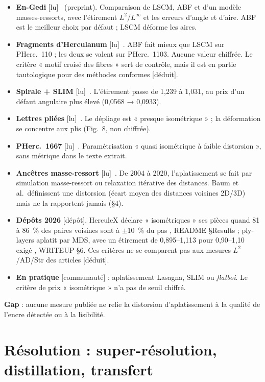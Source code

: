 \documentclass[11pt,a4paper]{article}
\newcommand{\lu}{\textsf{\small[lu]}}
\newcommand{\deduit}{\textsf{\small[déduit]}}
\newcommand{\commu}{\textsf{\small[communauté]}}
\newcommand{\depot}{\textsf{\small[dépôt]}}
\newcommand{\pherc}[1]{PHerc.~#1}
\begin{document}
\begin{itemize}
  \item \textbf{En-Gedi} \lu~\cite{parker2020} (preprint). Comparaison de LSCM, ABF et d'un
  modèle masses-ressorts, avec l'étirement $L^2$/$L^\infty$ et les erreurs d'angle et
  d'aire. ABF est le meilleur choix par défaut ; LSCM déforme les aires.
  \item \textbf{Fragments d'Herculanum} \lu~\cite{stabile2021}. ABF fait mieux que LSCM sur
  \pherc{110} ; les deux se valent sur \pherc{1103}. Aucune valeur chiffrée. Le critère
  « motif croisé des fibres » sert de contrôle, mais il est en partie tautologique pour des
  méthodes conformes \deduit.
  \item \textbf{Spirale + SLIM} \lu~\cite{henderson2025}. L'étirement passe de 1,239 à 1,031,
  au prix d'un défaut angulaire plus élevé (0,0568 → 0,0933).
  \item \textbf{Lettres pliées} \lu~\cite{dambrogio2021}. Le dépliage est « presque
  isométrique » ; la déformation se concentre aux plis (Fig.~8, non chiffrée).
  \item \textbf{\pherc{1667}} \lu~\cite{angelotti2026complete}. Paramétrisation « quasi
  isométrique à faible distorsion », sans métrique dans le texte extrait.
  \item \textbf{Ancêtres masse-ressort} \lu~\cite{seales2004,lin2005,baum2017,mahnke2020}.
  De 2004 à 2020, l'aplatissement se fait par simulation masse-ressort ou relaxation
  itérative des distances. Baum et al.\ définissent une distorsion (écart moyen des distances
  voisines 2D/3D) mais ne la rapportent jamais (§4).
  \item \textbf{Dépôts 2026} \depot. HerculeX déclare « isométriques » ses pièces quand
  81 à 86~\% des paires voisines sont à $\pm$10~\% du pas \cite{betka2026}, README §Results ;
  ply-layers aplatit par MDS, avec un étirement de 0,895–1,113 pour 0,90–1,10 exigé
  \cite{devore2026}, WRITEUP §6. Ces critères ne se comparent pas aux mesures $L^2$/AD/Str
  des articles \deduit.
  \item \textbf{En pratique} \commu{} : aplatissement Lasagna, SLIM ou \emph{flatboi}. Le
  critère de prix « isométrique » n'a pas de seuil chiffré.
\end{itemize}
\textbf{Gap} : aucune mesure publiée ne relie la distorsion d'aplatissement à la qualité de
l'encre détectée ou à la lisibilité.

\section{Résolution : super-résolution, distillation, transfert}
\end{document}
